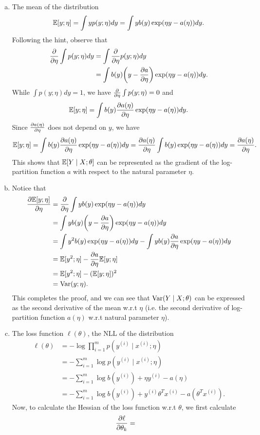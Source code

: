 \documentclass[12pt,letterpaper,boxed]{hmcpset}
\newcommand{\yy}{y^{(i)}}
\newcommand{\xx}{x^{(i)}}
\begin{document}
\begin{solution}
  \begin{enumerate}[(a)]
    \item The mean of the distribution
    \[
    \mathbb{E}[y; \eta] = \int y p(y ; \eta) dy = \int y b(y) \exp(\eta y - a(\eta)) dy.
    \]
    Following the hint, observe that
    \[
    \begin{aligned}
      \pd{\eta} \int p(y;\eta) dy &= \int \pd{\eta} p(y ; \eta) dy \\ 
      &= \int b(y) \qty(y - \pdv{a}{\eta}) \exp(\eta y - a(\eta)) dy.
    \end{aligned}
    \]
    While $\int p(y; \eta) dy = 1$, we have $\pd{\eta} \int p(y; \eta) = 0$ and 
    \[
    \mathbb{E}[y ; \eta] = \int b(y) \pdv{a(\eta)}{\eta} \exp(\eta y - a(\eta)) dy.
    \]
    Since $\pdv{a(\eta)}{\eta}$ does not depend on $y$, we have
    \[
    \mathbb{E}[y ;\eta] = \int b(y) \pdv{a(\eta)}{\eta} \exp(\eta y - a(\eta)) dy = \pdv{a(\eta)}{\eta} \int b(y) \exp(\eta y - a(\eta)) dy = \pdv{a(\eta)}{\eta}.
    \]
    This shows that $\mathbb{E}[Y \mid X; \theta]$ can be represented as the gradient of the log-partition function $a$ with respect to the natural parameter $\eta$.

    \item Notice that
    \[
    \begin{aligned}
      \pdv{\E[y; \eta]}{\eta} &= 
      \pd{\eta} \int y b(y) \exp(\eta y - a(\eta)) dy \\
      &= \int y b(y) \qty(y - \pdv{a}{\eta}) \exp(\eta y - a(\eta)) dy \\
      &= \int y^2 b(y) \exp(\eta y - a(\eta)) dy - \int y b(y) \pdv{a}{\eta} \exp(\eta y - a(\eta)) dy \\
      &= \E[y^2; \eta] - \pdv{a}{\eta} \E[y; \eta] \\
      &= \E[y^2; \eta] - (\E[y; \eta])^2 \\
      &= \Var(y; \eta).
    \end{aligned}
    \]
    This completes the proof, and we can see that $\operatorname{Var}(Y \mid X ; \theta)$ can be expressed as the second derivative of the mean w.r.t $\eta$ (i.e. the second derivative of log-partition function $a(\eta)$ w.r.t natural parameter $\eta$).

    \item The loss function $\ell(\theta)$, the NLL of the distribution
    \[
    \begin{aligned}
      \ell(\theta) &= - \log \prod_{i=1}^m p(\yy \mid \xx ; \eta) \\
      &= - \sum_{i=1}^{m} \log p(\yy \mid \xx ; \eta) \\
      &= - \sum_{i=1}^{m} \log b(\yy) + \eta \yy - a(\eta) \\
      &= - \sum_{i=1}^{m} \log b(\yy) + \yy \theta^T \xx - a(\theta^T \xx).
    \end{aligned}
    \]
    Now, to calculate the Hessian of the loss function w.r.t $\theta$, we first calculate
    \[
    \begin{aligned}
      \pdv{\ell}{\theta_k} &=
    \end{aligned}
    \]


  \end{enumerate}
\end{solution}
\end{document}
